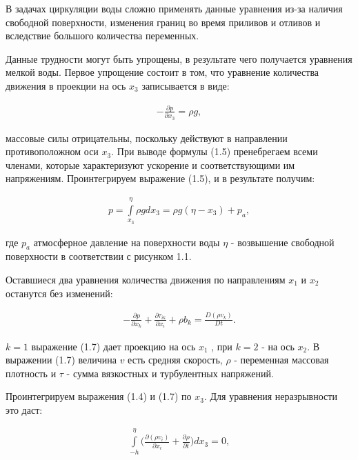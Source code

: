 \documentclass[14pt]{extreport}
\begin{document}
В задачах циркуляции воды сложно применять данные уравнения из-за наличия свободной поверхности, изменения границ во время приливов и отливов и вследствие большого количества переменных.

Данные трудности могут быть упрощены, в результате чего получается уравнения мелкой воды. Первое упрощение состоит в том, что уравнение количества движения в проекции на ось $ x_3 $ записывается в виде:

\begin{gather}
-\frac{\partial p}{\partial x_3}=\rho g, 
\end{gather}

 массовые силы отрицательны, поскольку действуют в направлении противоположном оси $ x_3 $. При выводе формулы (1.5) пренебрегаем всеми членами, которые характеризуют ускорение и соответствующими им напряжениям. Проинтегрируем выражение (1.5), и в результате получим:

\begin{gather}
p = \int\limits^\eta_{x_3} \rho g dx_3 = \rho g (\eta-x_3)+p_a,
\end{gather}

\noindent где $p_a$ атмосферное давление на поверхности воды
$\eta$ - возвышение свободной поверхности в соответствии с рисунком 1.1.



Оставшиеся два уравнения количества движения по направлениям $x_1$ и $x_2$ останутся без изменений:

\begin{gather}
-\frac{\partial p}{\partial x_k} + \frac{\partial \tau_{ik}}{\partial x_i} + \rho b_k = \frac{D(\rho v_k)}{Dt}.
\end{gather}

 $k=1$ выражение (1.7) дает проекцию на ось $ x_1 $ , при $k=2$ - на ось $ x_2 $. В выражении (1.7) величина $v$ есть средняя скорость, $\rho$ - переменная массовая плотность и $\tau$ - сумма вязкостных и турбулентных напряжений.

Проинтегрируем выражения (1.4) и (1.7) по $ x_3 $. Для уравнения неразрывности это даст:

\begin{gather}
\int\limits^\eta_{-h} \bigg(\frac{\partial (\rho v_i)}{\partial x_i} + \frac{\partial \rho}{\partial t}\bigg) dx_3 =0,
\end{gather}
\end{document}
